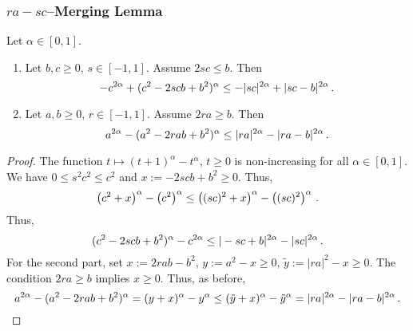 \subsubsection{$ra-sc$--Merging Lemma}
%
\begin{lemma}
	Let $\alpha\in[0,1]$.
	\theoremContentInNewLine
	\begin{enumerate}[label=\environmentEnumerateLabel]
	\item 
		Let $b,c\geq0$, $s\in[-1,1]$.
		Assume $2sc \leq b$.
		Then
		\begin{equation*}
			-c^{2\alpha}+(c^2 - 2 s c b+b^2)^\alpha \leq 
			-|sc|^{2\alpha}+|sc-b|^{2\alpha}
			\, .
		\end{equation*}
	\item
		Let $a,b\geq0$, $r\in[-1,1]$.
		Assume $2ra \geq b$.
		Then
		\begin{equation*}
			a^{2\alpha}-(a^2 - 2 r a b+b^2)^\alpha \leq 
			|ra|^{2\alpha}-|ra-b|^{2\alpha}
			\, .
		\end{equation*}
	\end{enumerate}
\end{lemma}
%
\begin{proof}
	The function $t \mapsto (t+1)^\alpha-t^\alpha$, $t\geq0$ is non-increasing for all $\alpha\in[0,1]$.
	We have $0\leq s^2c^2\leq c^2$ and $x := -2 s c b+b^2 \geq 0$. Thus,
	\begin{equation*}
		\left( c^2+x \right)^\alpha-\left( c^2 \right)^\alpha \leq \left( (sc)^2+x \right)^\alpha-\left( (sc)^2 \right)^\alpha
		\, .
	\end{equation*}
	Thus, 
	\begin{equation*}
		(c^2-2 s c b+b^2)^\alpha -c^{2\alpha}\leq |-sc+b|^{2\alpha}-|sc|^{2\alpha}
		\, .
	\end{equation*}
	For the second part, set $x:=2rab-b^2$, $y := a^2-x\geq0$, $\tilde y := |ra|^2-x\geq 0$. The condition $2ra\geq b$ implies $x\geq 0$.
	Thus, as before,
	\begin{equation*}
		a^{2\alpha}-(a^2 - 2 r a b+b^2)^\alpha 
		=
		(y+x)^\alpha-y^\alpha 
		\leq 
		(\tilde y+x)^\alpha-\tilde y^\alpha 
		=
		|ra|^{2\alpha}-|ra-b|^{2\alpha}
		\, .
	\end{equation*}
\end{proof}
%
